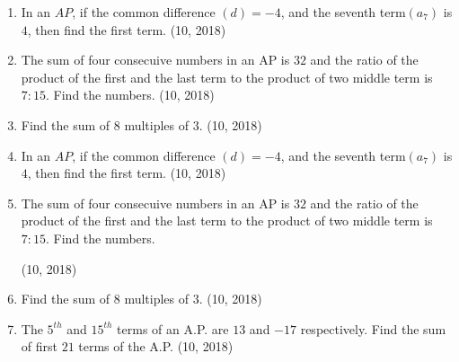 \begin{enumerate}[label=\thesubsection.\arabic*,ref=\thesubsection.\theenumi,itemsep=1pt]
			 \item In an $AP$, if the common difference $(d) = -4$, and the seventh term$(a_7)$ is $4$, then find the first term.		
			\hfill (10, 2018) \item The sum of four consecuive numbers in an AP is $32$ and the ratio of the product of the first and the last term to the product of two middle term is $7:15$. Find the numbers.
	\hfill (10, 2018) \item Find the sum of $8$ multiples of $3$.
\hfill (10, 2018)

			 \item In an $AP$, if the common difference $(d) = -4$, and the seventh term$(a_7)$ is $4$, then find the first term.		
			\hfill (10, 2018) \item The sum of four consecuive numbers in an AP is $32$ and the ratio of the product of the first and the last term to the product of two middle term is $7:15$. Find the numbers.

	\hfill (10, 2018) \item Find the sum of $8$ multiples of $3$.
\hfill (10, 2018)
 \item The $5^{th}$ and $15^{th}$ terms of an A.P. are $13$ and $-17$ respectively. Find the sum of first $21$ terms of the A.P.
\hfill (10, 2018)


\end{enumerate}
